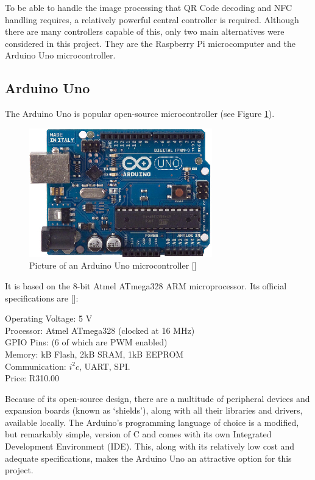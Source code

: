 To be able to handle the image processing that QR Code decoding and NFC handling requires, a
relatively powerful central controller is required. Although there are many controllers capable
of this, only two main alternatives were considered in this project. They are the Raspberry Pi microcomputer and
the Arduino Uno microcontroller.

\subsection{Arduino Uno}

The Arduino Uno is popular open-source microcontroller (see Figure \ref{fig:arduino}). 

\begin{figure}[h]
\centering
\includegraphics[scale=1.5]{arduino.eps}
\caption[Picture of an Arduino Uno microcontroller]{Picture of an Arduino Uno microcontroller
[\cite{manual:arduino-specs}]}
\label{fig:arduino}
\end{figure}

It is
based on the 8-bit Atmel ATmega328 ARM microprocessor. Its official specifications are [\cite{website:arduino-specs}]:

\begin{tabbing}

Operating Voltage: \= 5 V \\ 
Processor: \> Atmel ATmega328 (clocked at 16 MHz) \\
GPIO Pins:  (6 of which are PWM enabled) \\
Memory:  kB Flash, 2kB SRAM, 1kB EEPROM \\
Communication: \> $i^2c$, UART, SPI. \\
Price: \> R310.00 \\

\end{tabbing}

Because of its open-source design, there are a multitude of peripheral devices and expansion
boards (known as `shields'), along with all their libraries and drivers, available locally. The
Arduino's programming language of choice is a modified, but remarkably simple, version of C
and comes with its own Integrated Development Environment (IDE). This, along
with its relatively low cost and adequate specifications, makes the Arduino Uno
an attractive option for this project.

